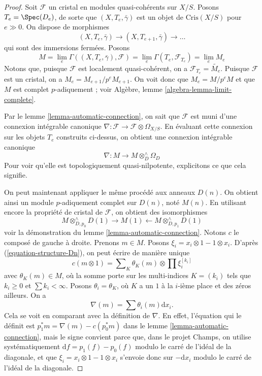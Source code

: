 \begin{proof}
Soit $\mathcal{F}$ un cristal en modules quasi-cohérents sur $X/S$.
Posons $T_e = \Spec(D_e)$, de sorte que $(X, T_e, \bar\gamma)$ est un objet
de $\text{Cris}(X/S)$ pour $e \gg 0$. On dispose de morphismes
$$
(X, T_e, \bar\gamma) \to (X, T_{e + 1}, \bar\gamma) \to \ldots
$$
qui sont des immersions fermées. Posons
$$
M =
\lim_e \Gamma((X, T_e, \bar\gamma), \mathcal{F}) =
\lim_e \Gamma(T_e, \mathcal{F}_{T_e}) = \lim_e M_e
$$
Notons que, puisque $\mathcal{F}$ est localement quasi-cohérent, on a
$\mathcal{F}_{T_e} = \widetilde{M_e}$. Puisque $\mathcal{F}$ est un
cristal, on a $M_e = M_{e + 1}/p^eM_{e + 1}$. On voit donc que
$M_e = M/p^eM$ et que $M$ est complet $p$-adiquement ; voir
Algèbre, lemme \ref{algebra-lemma-limit-complete}.

\medskip\noindent
Par le lemme \ref{lemma-automatic-connection}, on sait que $\mathcal{F}$
est muni d'une connexion intégrable canonique
$\nabla : \mathcal{F} \to \mathcal{F} \otimes \Omega_{X/S}$.
En évaluant cette connexion sur les objets $T_e$ construits ci-dessus,
on obtient une connexion intégrable canonique
$$
\nabla : M \longrightarrow M \otimes^\wedge_D \Omega_D
$$
Pour voir qu'elle est topologiquement quasi-nilpotente, explicitons ce que cela signifie.

\medskip\noindent
On peut maintenant appliquer le même procédé aux anneaux $D(n)$.
On obtient ainsi un module $p$-adiquement complet sur $D(n)$, noté $M(n)$. En utilisant encore
la propriété de cristal de $\mathcal{F}$, on obtient des isomorphismes
$$
M \otimes^\wedge_{D, p_0} D(1) \rightarrow M(1)
\leftarrow M \otimes^\wedge_{D, p_1} D(1)
$$
voir la démonstration du lemme \ref{lemma-automatic-connection}.
Notons $c$ le composé de gauche à droite. Prenons $m \in M$.
Posons $\xi_i = x_i \otimes 1 - 1 \otimes x_i$.
D'après (\ref{equation-structure-Dn}), on peut écrire de manière unique
$$
c(m \otimes 1) = \sum\nolimits_K \theta_K(m) \otimes \prod \xi_i^{[k_i]}
$$
avec $\theta_K(m) \in M$, où la somme porte sur les multi-indices
$K = (k_i)$ tels que $k_i \geq 0$ et $\sum k_i < \infty$. Posons
$\theta_i = \theta_K$, où $K$ a un $1$ à la $i$-ième place et
des zéros ailleurs. On a
$$
\nabla(m) = \sum \theta_i(m) \text{d}x_i.
$$
Cela se voit en comparant avec la définition de
$\nabla$. En effet, l'équation qui le définit est
$p_1^*m = \nabla(m) - c(p_0^*m)$ dans le lemme \ref{lemma-automatic-connection},
mais le signe convient parce que, dans le projet Champs, on utilise systématiquement
$\text{d}f = p_1(f) - p_0(f)$ modulo le carré de l'idéal de la diagonale,
et que $\xi_i = x_i \otimes 1 - 1 \otimes x_i$ s'envoie donc sur $-\text{d}x_i$
modulo le carré de l'idéal de la diagonale.


\end{proof}
